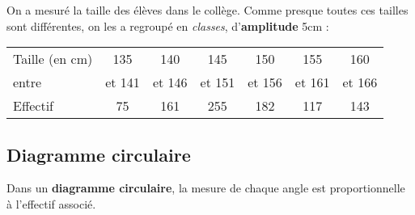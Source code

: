 \documentclass[../€Cours-complet/Cours-complet]{subfiles}
\begin{document}
\begin{exemple}
	On a mesuré la taille des élèves dans le collège. Comme presque toutes ces tailles sont différentes, on les a regroupé en \textit{classes}, d'\textbf{amplitude} 5cm :


	\begin{center}
		\begin{tabular}{|l|c|c|c|c|c|c|}
			\hline
			Taille (en cm) & 135    & 140    & 145    & 150    & 155    & 160
			\\
			entre          & et 141 & et 146 & et 151 & et 156 & et 161 & et 166
			\\ \hline
			Effectif       & 75     & 161    & 255    & 182    & 117    & 143    %
			\\ \hline
		\end{tabular}
	\end{center}

	\begin{center}
	\end{center}
\end{exemple}

\subsection{Diagramme circulaire}

\begin{cours}
	Dans un \textbf{diagramme circulaire}, la mesure de chaque angle est proportionnelle à l'effectif associé.
\end{cours}
\end{document}

